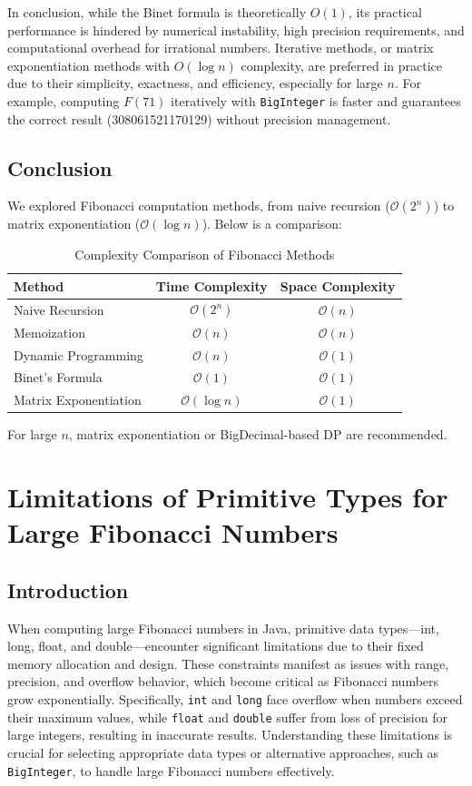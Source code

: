 \documentclass{article}
\begin{document}
In conclusion, while the Binet formula is theoretically \(O(1)\), its practical performance is hindered by numerical instability, high precision requirements, and computational overhead for irrational numbers. Iterative methods, or matrix exponentiation methods with \(O(\log n)\) complexity, are preferred in practice due to their simplicity, exactness, and efficiency, especially for large \(n\). For example, computing \(F(71)\) iteratively with \texttt{BigInteger} is faster and guarantees the correct result (308061521170129) without precision management.


\subsection{Conclusion}
We explored Fibonacci computation methods, from naive recursion ($\mathcal{O}(2^n)$) to matrix exponentiation ($\mathcal{O}(\log n)$). Below is a comparison:

\begin{table}[h]
	\centering
	\begin{tabular}{|l|c|c|}
		\hline
		\textbf{Method} & \textbf{Time Complexity} & \textbf{Space Complexity} \\
		\hline
		Naive Recursion & $\mathcal{O}(2^n)$ & $\mathcal{O}(n)$ \\
		Memoization & $\mathcal{O}(n)$ & $\mathcal{O}(n)$ \\
		Dynamic Programming & $\mathcal{O}(n)$ & $\mathcal{O}(1)$ \\
		Binet's Formula & $\mathcal{O}(1)$ & $\mathcal{O}(1)$ \\
		Matrix Exponentiation & $\mathcal{O}(\log n)$ & $\mathcal{O}(1)$ \\
		\hline
	\end{tabular}
	\caption{Complexity Comparison of Fibonacci Methods}
\end{table}

For large $n$, matrix exponentiation or BigDecimal-based DP are recommended.

\section{Limitations of Primitive Types for Large Fibonacci Numbers}
\subsection{Introduction}
When computing large Fibonacci numbers in Java, primitive data types---int, long, float, and double---encounter significant limitations due to their fixed memory allocation and design. These constraints manifest as issues with range, precision, and overflow behavior, which become critical as Fibonacci numbers grow exponentially. Specifically, \texttt{int} and \texttt{long} face overflow when numbers exceed their maximum values, while \texttt{float} and \texttt{double} suffer from loss of precision for large integers, resulting in inaccurate results. Understanding these limitations is crucial for selecting appropriate data types or alternative approaches, such as \texttt{BigInteger}, to handle large Fibonacci numbers effectively.
\end{document}
